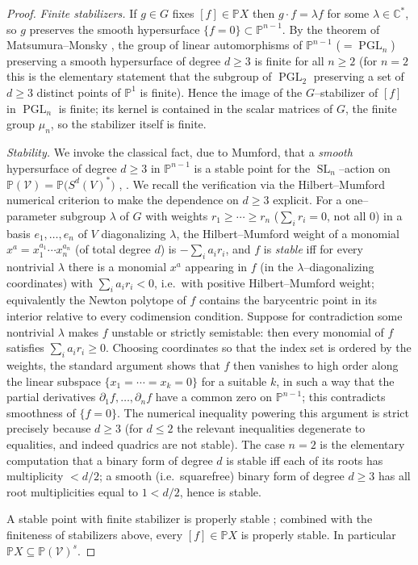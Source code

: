 \documentclass{amsart}
\theoremstyle{definition}
\DeclareMathOperator{\SL}{SL}
\DeclareMathOperator{\PGL}{PGL}
\newcommand{\PP}{\mathbb{P}}
\newcommand{\CC}{\mathbb{C}}
\begin{document}
\begin{proof}
\emph{Finite stabilizers.} If $g\in G$ fixes $[f]\in \PP X$ then $g\cdot f=\lambda f$ for
some $\lambda\in\CC^{*}$, so $g$ preserves the smooth hypersurface $\{f=0\}\subset\PP^{n-1}$.
By the theorem of Matsumura--Monsky \cite{MM}, the group of linear automorphisms of
$\PP^{n-1}$ ($=\PGL_n$) preserving a smooth hypersurface of degree $d\ge 3$ is finite for all
$n\ge 2$ (for $n=2$ this is the elementary statement that the subgroup of $\PGL_2$ preserving
a set of $d\ge 3$ distinct points of $\PP^1$ is finite). Hence the image of the
$G$--stabilizer of $[f]$ in $\PGL_n$ is finite; its kernel is contained in the scalar
matrices of $G$, the finite group $\mu_n$, so the stabilizer itself is finite.

\emph{Stability.} We invoke the classical fact, due to Mumford, that a \emph{smooth}
hypersurface of degree $d\ge 3$ in $\PP^{n-1}$ is a stable point for the $\SL_n$--action on
$\PP(\mathcal V)=\PP\big(S^d(V)^{*}\big)$ \cite[Prop.~4.2 and \S 4.2]{Mumford},
\cite[Ch.~4, \S 2]{MFK}. We recall the verification via the Hilbert--Mumford numerical
criterion to make the dependence on $d\ge 3$ explicit. For a one--parameter subgroup
$\lambda$ of $G$ with weights $r_1\ge\cdots\ge r_n$ ($\sum_i r_i=0$, not all $0$) in a basis
$e_1,\dots,e_n$ of $V$ diagonalizing $\lambda$, the Hilbert--Mumford weight of a monomial
$x^{a}=x_1^{a_1}\cdots x_n^{a_n}$ (of total degree $d$) is $-\sum_i a_i r_i$, and $f$ is
\emph{stable} iff for every nontrivial $\lambda$ there is a monomial $x^a$ appearing in $f$
(in the $\lambda$--diagonalizing coordinates) with $\sum_i a_i r_i<0$, i.e.\ with positive
Hilbert--Mumford weight; equivalently the Newton polytope of $f$ contains the barycentric
point in its interior relative to every codimension condition. Suppose for contradiction some
nontrivial $\lambda$ makes $f$ unstable or strictly semistable: then every monomial of $f$
satisfies $\sum_i a_i r_i\ge 0$. Choosing coordinates so that the index set is ordered by the
weights, the standard argument \cite[Prop.~4.2]{Mumford} shows that $f$ then vanishes to high
order along the linear subspace $\{x_1=\cdots=x_k=0\}$ for a suitable $k$, in such a way that
the partial derivatives $\partial_1 f,\dots,\partial_n f$ have a common zero on $\PP^{n-1}$;
this contradicts smoothness of $\{f=0\}$. The numerical inequality powering this argument is
strict precisely because $d\ge 3$ (for $d\le 2$ the relevant inequalities degenerate to
equalities, and indeed quadrics are not stable). The case $n=2$ is the elementary computation
that a binary form of degree $d$ is stable iff each of its roots has multiplicity $<d/2$; a
smooth (i.e.\ squarefree) binary form of degree $d\ge 3$ has all root multiplicities equal to
$1<d/2$, hence is stable.

A stable point with finite stabilizer is properly stable
\cite[Ch.~1, Def.~1.7 and Amplification~1.11]{MFK}; combined with the finiteness of
stabilizers above, every $[f]\in\PP X$ is properly stable. In particular
$\PP X\subseteq\PP(\mathcal V)^{s}$.
\end{proof}
\end{document}
